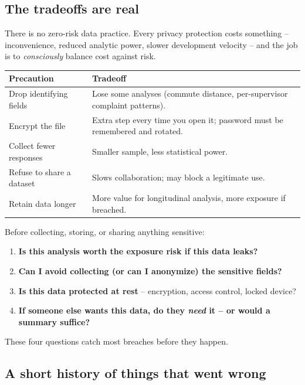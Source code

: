 \documentclass[11pt]{article}
\begin{document}
\subsection{The tradeoffs are real}

There is no zero-risk data practice. Every privacy protection costs
something -- inconvenience, reduced analytic power, slower development
velocity -- and the job is to \emph{consciously} balance cost against
risk.

\begin{center}
\small
\begin{tabular}{p{4.8cm} p{7.2cm}}
\textbf{Precaution} & \textbf{Tradeoff} \\
\hline
Drop identifying fields & Lose some analyses (commute distance,
per-supervisor complaint patterns). \\
Encrypt the file & Extra step every time you open it; password must
be remembered and rotated. \\
Collect fewer responses & Smaller sample, less statistical power. \\
Refuse to share a dataset & Slows collaboration; may block a
legitimate use. \\
Retain data longer & More value for longitudinal analysis, more
exposure if breached. \\
\end{tabular}
\normalsize
\end{center}

\begin{ideabox}
Before collecting, storing, or sharing anything sensitive:
\begin{enumerate}[leftmargin=*,noitemsep]
    \item \textbf{Is this analysis worth the exposure risk if this
          data leaks?}
    \item \textbf{Can I avoid collecting (or can I anonymize) the
          sensitive fields?}
    \item \textbf{Is this data protected at rest} -- encryption,
          access control, locked device?
    \item \textbf{If someone else wants this data, do they
          \emph{need} it -- or would a summary suffice?}
\end{enumerate}
These four questions catch most breaches before they happen.
\end{ideabox}

\subsection{A short history of things that went wrong}
\end{document}

